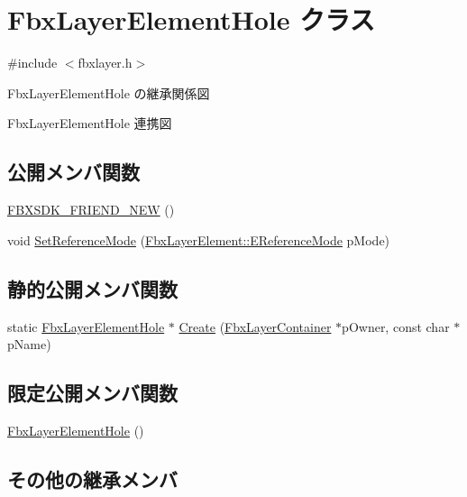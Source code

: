 \hypertarget{class_fbx_layer_element_hole}{}\section{Fbx\+Layer\+Element\+Hole クラス}
\label{class_fbx_layer_element_hole}


{\ttfamily \#include $<$fbxlayer.\+h$>$}



Fbx\+Layer\+Element\+Hole の継承関係図


Fbx\+Layer\+Element\+Hole 連携図
\subsection*{公開メンバ関数}
\begin{DoxyCompactItemize}
\item 
\hyperlink{class_fbx_layer_element_hole_a7180216993dbbb96cb3edbe3d2db5fa4}{F\+B\+X\+S\+D\+K\+\_\+\+F\+R\+I\+E\+N\+D\+\_\+\+N\+EW} ()
\item 
void \hyperlink{class_fbx_layer_element_hole_a496cc8811acb175197b76226f118149c}{Set\+Reference\+Mode} (\hyperlink{class_fbx_layer_element_a00f04654580ca9b2f5d292c11abd83fc}{Fbx\+Layer\+Element\+::\+E\+Reference\+Mode} p\+Mode)
\end{DoxyCompactItemize}
\subsection*{静的公開メンバ関数}
\begin{DoxyCompactItemize}
\item 
static \hyperlink{class_fbx_layer_element_hole}{Fbx\+Layer\+Element\+Hole} $\ast$ \hyperlink{class_fbx_layer_element_hole_ae2e9be9ff1db47440c55d72f00f4ef61}{Create} (\hyperlink{class_fbx_layer_container}{Fbx\+Layer\+Container} $\ast$p\+Owner, const char $\ast$p\+Name)
\end{DoxyCompactItemize}
\subsection*{限定公開メンバ関数}
\begin{DoxyCompactItemize}
\item 
\hyperlink{class_fbx_layer_element_hole_aa16cc2aabce4cbb8b03dd1206778a30f}{Fbx\+Layer\+Element\+Hole} ()
\end{DoxyCompactItemize}
\subsection*{その他の継承メンバ}


